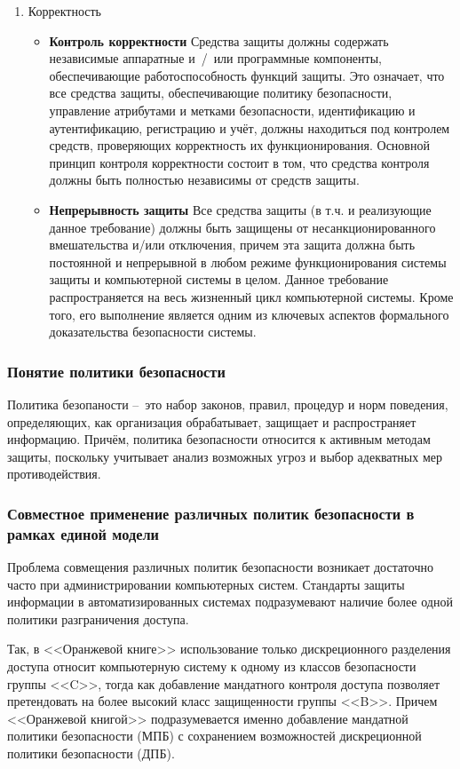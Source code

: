 \begin{enumerate}
	\item Корректность
	\begin{itemize}
		\item \textbf{Контроль корректности} Средства защиты должны содержать независимые аппаратные и~/~или программные компоненты, обеспечивающие работоспособность функций защиты. Это означает, что все средства защиты, обеспечивающие политику безопасности, управление атрибутами и метками безопасности, идентификацию и аутентификацию, регистрацию и учёт, должны находиться под контролем средств, проверяющих корректность их функционирования. Основной принцип контроля корректности состоит в том, что средства контроля должны быть полностью независимы от средств защиты.
		\item \textbf{Непрерывность защиты} Все средства защиты (в т.ч. и реализующие данное требование) должны быть защищены от несанкционированного вмешательства и/или отключения, причем эта защита должна быть постоянной и непрерывной в любом режиме функционирования системы защиты и компьютерной системы в целом. Данное требование распространяется на весь жизненный цикл компьютерной системы. Кроме того, его выполнение является одним из ключевых аспектов формального доказательства безопасности системы.
	\end{itemize}	
\end{enumerate}

\subsubsection{Понятие политики безопасности}
Политика безопаности -- это набор законов, правил, процедур и норм поведения, определяющих, как организация обрабатывает, защищает и распространяет информацию. Причём, политика безопасности относится к активным методам защиты, поскольку учитывает анализ возможных угроз и выбор адекватных мер противодействия.

\subsubsection{Совместное применение различных политик безопасности в рамках единой модели}
Проблема совмещения различных политик безопасности возникает достаточно часто при администрировании компьютерных систем. Стандарты защиты информации в автоматизированных системах подразумевают наличие более одной политики разграничения доступа. 

Так, в <<Оранжевой книге>> использование только дискреционного разделения доступа относит компьютерную систему к одному из классов безопасности группы <<C>>, тогда как добавление мандатного контроля доступа позволяет претендовать на более высокий класс защищенности группы <<B>>. Причем <<Оранжевой книгой>> подразумевается именно добавление мандатной политики безопасности (МПБ) с сохранением возможностей дискреционной политики безопасности (ДПБ).

